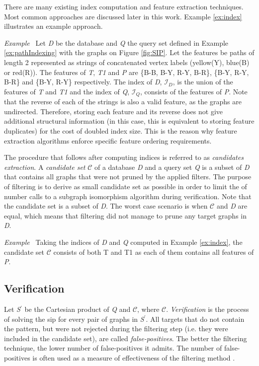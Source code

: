 \documentclass{l4proj}
\newcounter{example}[section]
\newenvironment{example}[1][]{\refstepcounter{example}\par\medskip
   \noindent \textit{Example~\theexample #1} \rmfamily}{\medskip}
\newcommand{\fancyI}{\mathcal{I}}
\newcommand{\fancyC}{\mathcal{C}}
\begin{document}
There are many existing index computation and feature extraction techniques. Most common approaches are discussed later in this work. Example \ref{ex:index} illustrates an example approach.

\begin{example}
\label{ex:index}
Let \emph{D} be the database and \emph{Q} the query set defined in Example \ref{ex:pathIndexing} with the graphs on Figure \ref{fig:SIP}. Let the features be paths of length 2 represented as strings of concatenated vertex labels (yellow(Y), blue(B) or red(R)). The features of \emph{T}, \emph{T1} and \emph{P} are \{B-B, B-Y, R-Y, B-R\}, \{B-Y, R-Y, B-R\} and \{B-Y, R-Y\} respectively. The index of \emph{D}, $\fancyI_{D}$, is the union of the features of \emph{T} and \emph{T1} and the index of \emph{Q}, $\fancyI_{Q}$, consists of the features of \emph{P}. Note that the reverse of each of the strings is also a valid feature, as the graphs are undirected. Therefore, storing each feature and its reverse does not give additional structural information (in this case, this is equivalent to storing feature duplicates) for the cost of doubled index size. This is the reason why feature extraction algorithms enforce specific feature ordering requirements.
\end{example}

The procedure that follows after computing indices is referred to as \emph{candidates extraction}. A \emph{candidate set} $\fancyC$ of a database \emph{D} and a query set \emph{Q} is a subset of \emph{D} that contains all graphs that were not pruned by the applied filters. 
The purpose of filtering is to derive as small candidate set as possible in order to limit the of number calls to a subgraph isomorphism algorithm during verification. Note that the candidate set is a subset of \emph{D}. The worst case scenario is when $\fancyC$ and \emph{D} are equal, which means that filtering did not manage to prune any target graphs in \emph{D}.

\begin{example}
Taking the indices of \emph{D} and \emph{Q} computed in Example \ref{ex:index}, the candidate set $\fancyC$ consists of both T and T1 as each of them contains all features of \emph{P}.
\end{example}

\subsection{Verification}
Let \emph{S$^\prime$} be the Cartesian product of \emph{Q} and $\fancyC$, where $\fancyC$. \emph{Verification} is the process of solving the \gls{sip} for every pair of graphs in \emph{S$^\prime$}. All targets that do not contain the pattern, but were not rejected during the filtering step (i.e. they were included in the candidate set), are called \emph{false-positives}. The better the filtering technique, the lower number of false-positives it admits. The number of false-positives is often used as a measure of effectiveness of the filtering method \cite{foteini}.
\end{document}
